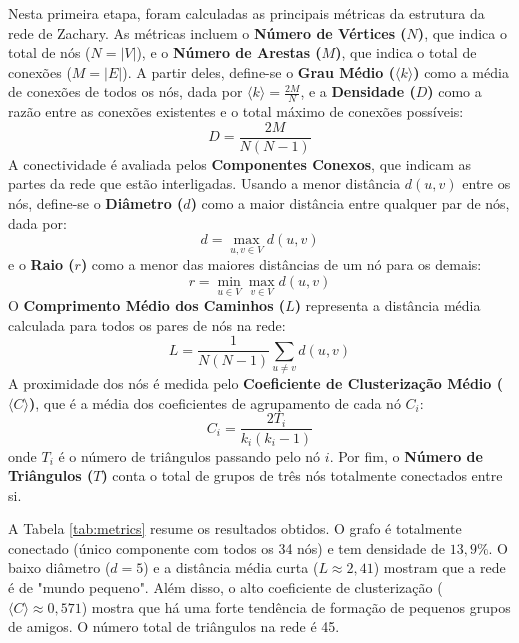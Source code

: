 \documentclass[sigconf,nonacm]{webmedia}
\begin{document}
Nesta primeira etapa, foram calculadas as principais métricas da estrutura da rede de Zachary. As métricas incluem o \textbf{Número de Vértices ($N$)}, que indica o total de nós ($N = |V|$), e o \textbf{Número de Arestas ($M$)}, que indica o total de conexões ($M = |E|$). A partir deles, define-se o \textbf{Grau Médio ($\langle k \rangle$)} como a média de conexões de todos os nós, dada por $\langle k \rangle = \frac{2M}{N}$, e a \textbf{Densidade ($D$)} como a razão entre as conexões existentes e o total máximo de conexões possíveis:
\begin{equation}
    D = \frac{2M}{N(N - 1)}
\end{equation}
A conectividade é avaliada pelos \textbf{Componentes Conexos}, que indicam as partes da rede que estão interligadas. Usando a menor distância $d(u,v)$ entre os nós, define-se o \textbf{Diâmetro ($d$)} como a maior distância entre qualquer par de nós, dada por:
\begin{equation}
    d = \max_{u, v \in V} d(u, v)
\end{equation}
e o \textbf{Raio ($r$)} como a menor das maiores distâncias de um nó para os demais:
\begin{equation}
    r = \min_{u \in V} \max_{v \in V} d(u, v)
\end{equation}
O \textbf{Comprimento Médio dos Caminhos ($L$)} representa a distância média calculada para todos os pares de nós na rede:
\begin{equation}
    L = \frac{1}{N(N - 1)} \sum_{u \neq v} d(u, v)
\end{equation}
A proximidade dos nós é medida pelo \textbf{Coeficiente de Clusterização Médio ($\langle C \rangle$)}, que é a média dos coeficientes de agrupamento de cada nó $C_i$:
\begin{equation}
    C_i = \frac{2 T_i}{k_i (k_i - 1)}
\end{equation}
onde $T_i$ é o número de triângulos passando pelo nó $i$. Por fim, o \textbf{Número de Triângulos ($T$)} conta o total de grupos de três nós totalmente conectados entre si.

A Tabela \ref{tab:metrics} resume os resultados obtidos. O grafo é totalmente conectado (único componente com todos os 34 nós) e tem densidade de $13,9\%$. O baixo diâmetro ($d = 5$) e a distância média curta ($L \approx 2,41$) mostram que a rede é de "mundo pequeno". Além disso, o alto coeficiente de clusterização ($\langle C \rangle \approx 0,571$) mostra que há uma forte tendência de formação de pequenos grupos de amigos. O número total de triângulos na rede é 45.
\end{document}
